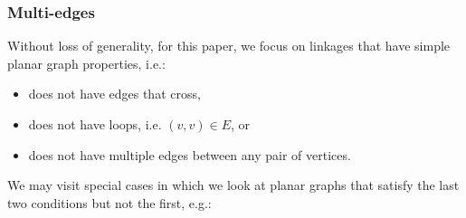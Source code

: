 \subsubsection{Multi-edges}
Without loss of generality, for this paper, we focus on 
linkages that have simple planar graph properties, i.e.:
\begin{itemize}
\item[\rn{1}] does not have edges that cross,
\item[\rn{2}] does not have loops, i.e. $(v,v) \in E$, or
\item[\rn{3}] does not have multiple edges between any pair of vertices.
\end{itemize}  
We may visit special cases in which we look at planar graphs that satisfy the last two conditions 
but not the first, e.g.:
